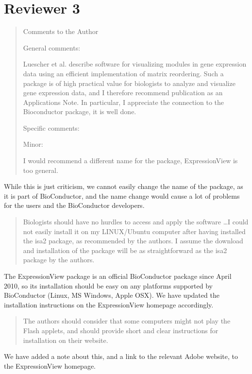 \documentclass[a4paper]{article}
\newenvironment{myquote}{\begin{quote}\color{blue}}{\end{quote}}
\begin{document}
\section*{Reviewer 3}

\begin{myquote}
Comments to the Author

General comments:

Luescher et al. describe software for visualizing modules in gene
expression data using an efficient implementation of matrix
reordering. Such a package is of high practical value for biologists
to analyze and visualize gene expression data, and I therefore
recommend publication as an Applications Note. In particular, I
appreciate the connection to the Bioconductor package, it is well
done.

Specific comments:

Minor:

I would recommend a different name for the package, ExpressionView is
too general.
\end{myquote}

While this is just criticism, we cannot easily change the name of the
package, as it is part of BioConductor, and the name change would
cause a lot of problems for the users and the BioConductor developers.

\begin{myquote}
Biologists should have no hurdles to access and apply the software
\ldots I could not easily install it on my LINUX/Ubuntu computer after
having installed the isa2 package, as recommended by the authors. 
I assume the download and installation of the package will be as
straightforward as the isa2 package by the authors.
\end{myquote}

The ExpressionView package is an official BioConductor package since
April 2010, so its installation should be easy on any platforms
supported by BioConductor (Linux, MS Windows, Apple OSX). We have
updated the installation instructions on the ExpressionView homepage
accordingly.

\begin{myquote}
The authors should consider that some computers might not play the
Flash applets, and should provide short and clear instructions for
installation on their website.
\end{myquote}

We have added a note about this, and a link to the relevant Adobe
website, to the ExpressionView homepage.



\end{document}
